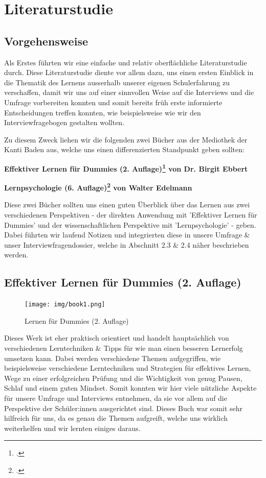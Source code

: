 \documentclass[12pt,a4paper]{report}
\begin{document}
\section{Literaturstudie}
\subsection{Vorgehensweise}
Als Erstes führten wir eine einfache und relativ oberflächliche Literaturstudie durch.
Diese Literaturstudie diente vor allem dazu, uns einen ersten Einblick in die Thematik des Lernens ausserhalb unserer eigenen Schulerfahrung zu verschaffen, damit wir uns auf einer sinnvollen Weise auf die Interviews und die Umfrage vorbereiten konnten und somit bereits früh erste informierte Entscheidungen treffen konnten, wie beispielsweise wie wir den Interviewfragebogen gestalten wollten.

Zu diesem Zweck liehen wir die folgenden zwei Bücher aus der Mediothek der Kanti Baden aus, welche uns einen differenzierten Standpunkt geben sollten:
\begin{list}{}
    \item \textbf{Effektiver Lernen für Dummies (2. Auflage)\footcite{Book1} von Dr. Birgit Ebbert}
    \item \textbf{Lernpsychologie (6. Auflage)\footcite{Book2} von Walter Edelmann} \linebreak
    
\end{list}
Diese zwei Bücher sollten uns einen guten Überblick über das Lernen aus zwei verschiedenen Perspektiven - der direkten Anwendung mit 'Effektiver Lernen für Dummies' und der wissenschaftlichen Perspektive mit 'Lernpsychologie' - geben. Dabei führten wir laufend Notizen und integrierten diese in unsere Umfrage \& unser Interviewfragendossier, welche in Abschnitt 2.3 \& 2.4 näher beschrieben werden.

\subsection{Effektiver Lernen für Dummies (2. Auflage)}
\begin{figure}[H]
    \centering
    \texttt{[image: img/book1.png]}
    \caption{Lernen für Dummies (2. Auflage)}
\end{figure}

Dieses Werk ist eher praktisch orientiert und handelt hauptsächlich von verschiedenen Lerntechniken \& Tipps für wie man einen besseren Lernerfolg umsetzen kann. 
Dabei werden verschiedene Themen aufgegriffen, wie beispielsweise verschiedene Lerntechniken und Strategien für effektives Lernen, Wege zu einer erfolgreichen Prüfung und die Wichtigkeit von genug Pausen, Schlaf und einem guten Mindset.
Somit konnten wir hier viele nützliche Aspekte für unsere Umfrage und Interviews entnehmen, da sie vor allem auf die Perspektive der Schüler:innen ausgerichtet sind. 
Dieses Buch war somit sehr hilfreich für uns, da es genau die Themen aufgreift, welche uns wirklich weiterhelfen und wir lernten einiges daraus.
\end{document}
